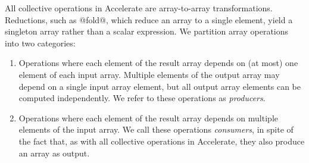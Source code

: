 All collective operations in Accelerate are array-to-array transformations.
Reductions, such as @fold@, which reduce an array to a single element,
yield a singleton array rather than a scalar expression. We partition array
operations into two categories:

\begin{enumerate}
    \item Operations where each element of the result array depends on (at most)
        one element of each input array. Multiple elements of the output array
        may depend on a single input array element, but all output array
        elements can be computed independently. We refer to these operations as
        \emph{producers}.

    \item Operations where each element of the result array depends on multiple
        elements of the input array. We call these operations
        \emph{consumers}, in spite of the fact that, as with all
        collective operations in Accelerate, they also produce an array as
        output.
\end{enumerate}

